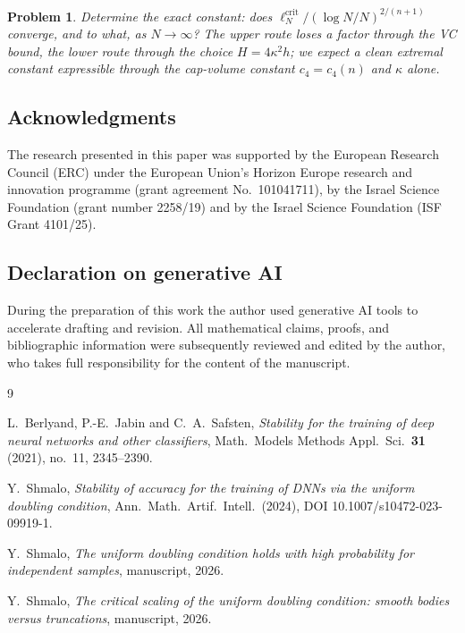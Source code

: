 \documentclass[11pt]{article}
\newtheorem{problem}[theorem]{Problem}
\begin{document}
\begin{problem}
Determine the exact constant: does
$\ell_N^{\mathrm{crit}}/(\log N/N)^{2/(n+1)}$ converge, and to what, as
$N\to\infty$?  The upper route loses a factor through the VC bound, the lower
route through the choice $H=4\kappa^2h$; we expect a clean extremal constant
expressible through the cap-volume constant $c_4=c_4(n)$ and $\kappa$ alone.
\end{problem}

\subsection*{Acknowledgments}
The research presented in this paper was supported by the European Research
Council (ERC) under the European Union's Horizon Europe research and innovation
programme (grant agreement No.\ 101041711), by the Israel Science Foundation
(grant number 2258/19) and by the Israel Science Foundation (ISF Grant
4101/25).

\subsection*{Declaration on generative AI}
During the preparation of this work the author used generative AI tools to
accelerate drafting and revision.  All mathematical claims, proofs, and
bibliographic information were subsequently reviewed and edited by the author,
who takes full responsibility for the content of the manuscript.

\begin{thebibliography}{9}

L.~Berlyand, P.-E.~Jabin and C.~A.~Safsten,
\emph{Stability for the training of deep neural networks and other
classifiers},
Math.\ Models Methods Appl.\ Sci.\ \textbf{31} (2021), no.~11, 2345--2390.

Y.~Shmalo,
\emph{Stability of accuracy for the training of DNNs via the uniform doubling
condition},
Ann.\ Math.\ Artif.\ Intell.\ (2024), DOI 10.1007/s10472-023-09919-1.

Y.~Shmalo,
\emph{The uniform doubling condition holds with high probability for
independent samples},
manuscript, 2026.

Y.~Shmalo,
\emph{The critical scaling of the uniform doubling condition: smooth bodies
versus truncations},
manuscript, 2026.

\end{thebibliography}
\end{document}
